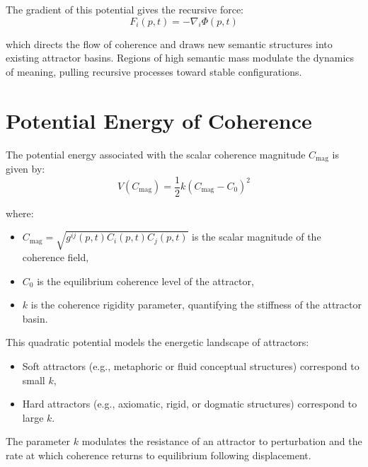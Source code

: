 The gradient of this potential gives the recursive force:
\begin{equation}
F_i(p, t) = -\nabla_i \Phi(p, t)
\end{equation}

which directs the flow of coherence and draws new semantic structures into existing attractor basins. Regions of high semantic mass modulate the dynamics of meaning, pulling recursive processes toward stable configurations.

\section{Potential Energy of Coherence}

The potential energy associated with the scalar coherence magnitude \(C_{\text{mag}}\) is given by:
\begin{equation}
V(C_{\text{mag}}) = \frac{1}{2}k(C_{\text{mag}} - C_0)^2
\end{equation}

where:
\begin{itemize}
    \item \(C_{\text{mag}} = \sqrt{g^{ij}(p, t) C_i(p, t) C_j(p, t)}\) is the scalar magnitude of the coherence field,
    \item \(C_0\) is the equilibrium coherence level of the attractor,
    \item \(k\) is the coherence rigidity parameter, quantifying the stiffness of the attractor basin.
\end{itemize}

This quadratic potential models the energetic landscape of attractors:
\begin{itemize}
    \item Soft attractors (e.g., metaphoric or fluid conceptual structures) correspond to small \(k\),
    \item Hard attractors (e.g., axiomatic, rigid, or dogmatic structures) correspond to large \(k\).
\end{itemize}

The parameter \(k\) modulates the resistance of an attractor to perturbation and the rate at which coherence returns to equilibrium following displacement. 